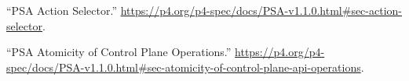 \documentclass[11pt]{article}
\begin{document}
{{\begin{thebibliography}{37}
\mdbibitemlabel{{}[21]}\textquotedblleft{}PSA Action Selector.\textquotedblright{} \href{https://p4.org/p4-spec/docs/PSA-v1.1.0.html\%23sec-action-selector}{{\ttfamily https://\hspace{0pt}p4.\hspace{0pt}org/\hspace{0pt}p4-\hspace{0pt}spec/\hspace{0pt}docs/\hspace{0pt}PSA-\hspace{0pt}v1.\hspace{0pt}1.\hspace{0pt}0.\hspace{0pt}html\#\hspace{0pt}sec-\hspace{0pt}action-\hspace{0pt}selector}}.\label{psaactionselector}%

\mdbibitemlabel{{}[22]}\textquotedblleft{}PSA Atomicity of Control Plane Operations.\textquotedblright{} \href{https://p4.org/p4-spec/docs/PSA-v1.1.0.html\%23sec-atomicity-of-control-plane-api-operations}{{\ttfamily https://\hspace{0pt}p4.\hspace{0pt}org/\hspace{0pt}p4-\hspace{0pt}spec/\hspace{0pt}docs/\hspace{0pt}PSA-\hspace{0pt}v1.\hspace{0pt}1.\hspace{0pt}0.\hspace{0pt}html\#\hspace{0pt}sec-\hspace{0pt}atomicity-\hspace{0pt}of-\hspace{0pt}control-\hspace{0pt}plane-\hspace{0pt}api-\hspace{0pt}operations}}.\label{psaatomicityofcontrolplaneops}%


\end{thebibliography}}}
\end{document}
